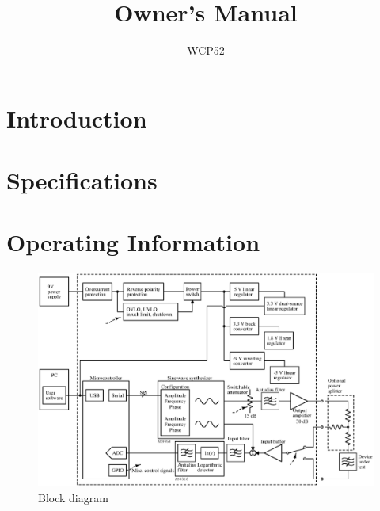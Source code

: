 \documentclass[article,oneside]{memoir}
\title{Owner's Manual}
\author{WCP52}
\begin{document}
\pagestyle{headings}

\begin{multicols}{2}

\tableofcontents
\listoffigures

\newpage
\chapter{Introduction}
\label{chap:intro}

\newpage
\chapter{Specifications}

\newpage
\chapter{Operating Information}


\end{multicols}
\newpage
\begin{figure}[H]
\centering
\includegraphics[width=6.5in]{blockdiagram}
\caption{Block diagram}
\label{fig:blockdiagram}
\end{figure}
\end{document}
